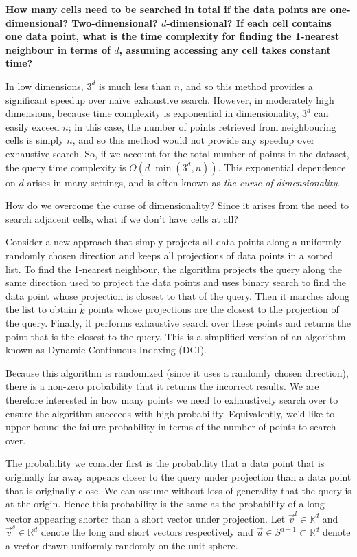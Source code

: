 \documentclass[preview]{standalone}
\begin{document}
\begin{Parts}
{\bf How many cells need to be searched in total if the data points are one-dimensional? Two-dimensional? $d$-dimensional? If each cell contains one data point, what is the time complexity for finding the 1-nearest neighbour in terms of $d$, assuming accessing any cell takes constant time?}



\Part In low dimensions, $3^{d}$ is much less than $n$, and so this method provides a significant speedup over na\"{i}ve exhaustive search. However, in moderately high dimensions, because time complexity is exponential in dimensionality, $3^{d}$ can easily exceed $n$; in this case, the number of points retrieved from neighbouring cells is simply $n$, and so this method would not provide any speedup over exhaustive search. So, if we account for the total number of points in the dataset, the query time complexity is $O(d\;\min(3^{d},n))$. This exponential dependence on $d$ arises in many settings, and is often known as \emph{the curse of dimensionality}.

How do we overcome the curse of dimensionality? Since it arises from the need to search adjacent cells, what if we don't have cells at all?

Consider a new approach that simply projects all data points along a uniformly randomly chosen direction and keeps all projections of data points in a sorted list. To find the 1-nearest neighbour, the algorithm projects the query along the same direction used to project the data points and uses binary search to find the data point whose projection is closest to that of the query. Then it marches along the list to obtain $\tilde{k}$ points whose projections are the closest to the projection of the query. Finally, it performs exhaustive search over these points and returns the point that is the closest to the query. This is a simplified version of an algorithm known as Dynamic Continuous Indexing (DCI).

Because this algorithm is randomized (since it uses a randomly chosen direction), there is a non-zero probability that it returns the incorrect results. We are therefore interested in how many points we need to exhaustively search over to ensure the algorithm succeeds with high probability. Equivalently, we'd like to upper bound the failure probability in terms of the number of points to search over.

The probability we consider first is the probability that a data point that is originally far away appears closer to the query under projection than a data point that is originally close. We can assume without loss of generality that the query is at the origin. Hence this probability is the same as the probability of a long vector appearing shorter than a short vector under projection. Let $\vec{v}^{l}\in\mathbb{R}^{d}$ and $\vec{v}^{s}\in\mathbb{R}^{d}$ denote the long and short vectors respectively and $\vec{u}\in S^{d-1}\subset\mathbb{R}^{d}$ denote a vector drawn uniformly randomly on the unit sphere.


\end{Parts}
\end{document}

